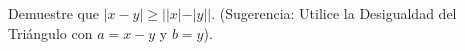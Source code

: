 \item Demuestre que $|x - y| \ge ||x| - |y||$. (Sugerencia: Utilice la Desigualdad del Triángulo con $a = x - y$ y $b = y$).
